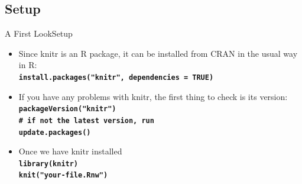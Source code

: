 \documentclass[10pt]{beamer}
\begin{document}
\subsection{Setup}
\begin{frame}{A First Look}{Setup}
	\begin{itemize}
		\item<1->Since knitr is an R package, it can be installed from CRAN in the usual
		way in R:\\
		{\tt \textbf{install.packages("knitr", dependencies = TRUE)}}\\
		\item<1->If you have any problems with knitr, the first thing to check is its version:\\
		{\tt \textbf{packageVersion("knitr")}}\\
		{\tt \textbf{\# if not the latest version, run}}\\
		{\tt \textbf{update.packages()}}\\
		\item<1->Once we have knitr installed\\
		{\tt \textbf{library(knitr)}}\\
		{\tt \textbf{knit("your-file.Rnw")}}
	\end{itemize}
\end{frame}
\end{document}
